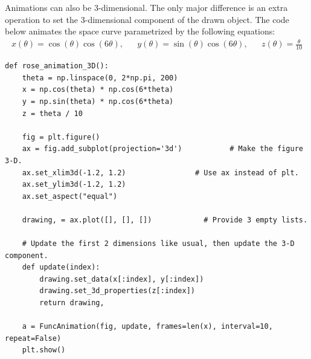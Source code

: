 Animations can also be 3-dimensional.
The only major difference is an extra operation to set the 3-dimensional component of the drawn object.
The code below animates the space curve parametrized by the following equations:
%
\[\begin{array}{ccccc}
x(\theta) = \cos(\theta)\cos(6\theta), &&
y(\theta) = \sin(\theta)\cos(6\theta), &&
z(\theta) = \frac{\theta}{10}
\end{array}\]

\begin{lstlisting}
def rose_animation_3D():
    theta = np.linspace(0, 2*np.pi, 200)
    x = np.cos(theta) * np.cos(6*theta)
    y = np.sin(theta) * np.cos(6*theta)
    z = theta / 10

    fig = plt.figure()
    ax = fig.add_subplot(projection='3d')           # Make the figure 3-D.
    ax.set_xlim3d(-1.2, 1.2)                # Use ax instead of plt.
    ax.set_ylim3d(-1.2, 1.2)
    ax.set_aspect("equal")

    drawing, = ax.plot([], [], [])            # Provide 3 empty lists.

    # Update the first 2 dimensions like usual, then update the 3-D component.
    def update(index):
        drawing.set_data(x[:index], y[:index])
        drawing.set_3d_properties(z[:index])
        return drawing,

    a = FuncAnimation(fig, update, frames=len(x), interval=10, repeat=False)
    plt.show()
\end{lstlisting}


